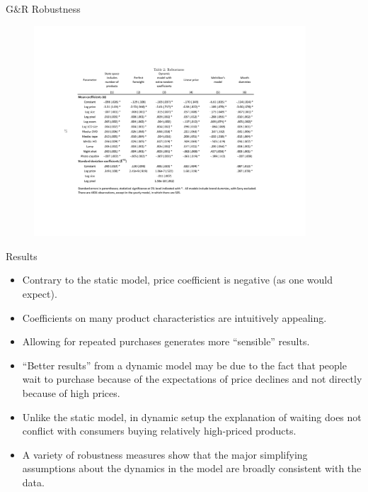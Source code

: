 \documentclass[xcolor=pdftex,dvipsnames,table,mathserif,aspectratio=169]{beamer}
\begin{document}
\begin{frame}{G\&R Robustness}
\begin{figure}[htbp]
\begin{center}
\includegraphics[width=4in]{resources/gandrtable2.pdf}
\end{center}
\end{figure}
\end{frame}


\begin{frame}{Results}
\begin{itemize}
\item Contrary to the static model, price coefficient is negative (as one would expect).
\item Coefficients on many product characteristics are intuitively appealing.
\item Allowing for repeated purchases generates more ``sensible'' results.
\item ``Better results'' from a dynamic model may be due to the fact that people wait to purchase because of the expectations of price declines and not directly because of high prices.
\item Unlike the static model, in dynamic setup the explanation of waiting does not conflict with consumers buying relatively high-priced products.
\item A variety of robustness measures show that the major simplifying assumptions about the dynamics in the model are broadly consistent with the data.
\end{itemize}
\end{frame}
\end{document}
